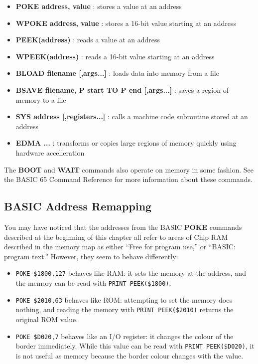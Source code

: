 \begin{itemize}
\item {\bf POKE address, value} : stores a value at an address
\item {\bf WPOKE address, value} : stores a 16-bit value starting at an address
\item {\bf PEEK(address)} : reads a value at an address
\item {\bf WPEEK(address)} : reads a 16-bit value starting at an address
\item {\bf BLOAD filename [,args...]} : loads data into memory from a file
\item {\bf BSAVE filename, P start TO P end [,args...]} : saves a region of memory to a file
\item {\bf SYS address [,registers...]} : calls a machine code subroutine
stored at an address
\item {\bf EDMA ...} : transforms or copies large regions of memory quickly
using hardware accelleration
\end{itemize}

The {\bf BOOT} and {\bf WAIT} commands also operate on memory in some fashion.
See the BASIC 65 Command Reference for more information about these commands.

\subsection{BASIC Address Remapping}

You may have noticed that the addresses from the BASIC {\bf POKE} commands
described at the beginning of this chapter all refer to areas of Chip
RAM described in the memory map as either ``Free for program use,'' or ``BASIC:
program text.'' However, they seem to behave differently:

\begin{itemize}
\item \texttt{POKE \$1800,127} behaves like RAM: it sets the memory at the address,
and the memory can be read with \texttt{PRINT PEEK(\$1800)}.
\item \texttt{POKE \$2010,63} behaves like ROM: attempting to set the memory does nothing,
and reading the memory with \texttt{PRINT PEEK(\$2010)} returns the original ROM value.
\item \texttt{POKE \$D020,7} behaves like an I/O register: it changes the colour of
the border immediately. While this value can be read with \texttt{PRINT
PEEK(\$D020)}, it is not useful as memory because the border colour changes with the value.
\end{itemize}

